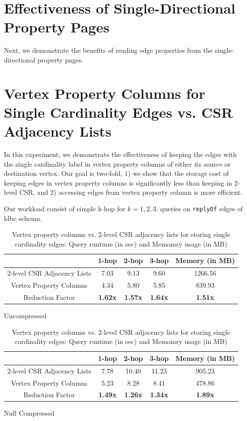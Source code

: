 \section{Effectiveness of Single-Directional Property Pages}
\label{exp:property-pages}

Next, we demonstrate the benefits of reading edge properties from the single-directional property pages.

\section{Vertex Property Columns for Single Cardinality Edges vs. CSR Adjacency Lists}
\label{exp:single-cardinality}

In this experiment, we demonstrate the effectiveness of keeping the edges with the single cardinality label in vertex property columns of either its source or destination vertex. Our goal is two-fold, 1) we show that the storage cost of keeping edges in vertex property columns is significantly less than keeping in 2-level CSR, and 2) accessing edges from vertex property column is more efficient. 

Our workload consist of simple k-hop for $k=1,2,3$. queries on \texttt{replyOf} edges of \gls{ldbc} schema. 

\begin{table}
	\centering
	\begin{subtable}{1\textwidth}
		\centering
		\begin{tabular}{ |c|c|c|c|c| } 
			\hline
			& 1-hop & 2-hop & 3-hop & Memory (in MB) \\ 
			\hline
			2-level CSR Adjacency Lists& 7.03 & 9.13 & 9.60 & 1266.56 \\ 
			\hline
			Vertex Property Columns& 4.34 & 5.80 & 5.85 & 839.93 \\ 
			\hline \hline
			Reduction Factor& \textbf{1.62x} & \textbf{1.57x} & \textbf{1.64x} & \textbf{1.51x} \\ 
			\hline
		\end{tabular}
		\captionsetup{justification=centering}
		\caption{Uncompressed}
		\label{tbl:mem2}
	\end{subtable}
	\begin{subtable}{1\textwidth}
		\centering
		\begin{tabular}{ |c|c|c|c|c| } 
			\hline
			& 1-hop & 2-hop & 3-hop & Memory (in MB) \\ 
			\hline
			2-level CSR Adjacency Lists& 7.78 & 10.40 & 11.23 & 905.23 \\ 
			\hline
			Vertex Property Columns& 5.23 & 8.28 & 8.41 & 478.86 \\ 
			\hline \hline
			Reduction Factor& \textbf{1.49x} & \textbf{1.26x} & \textbf{1.34x} & \textbf{1.89x} \\ 
			\hline
		\end{tabular}
		\captionsetup{justification=centering}
		\caption{Null Compressed}
		\label{tbl:mem2}
	\end{subtable}
	\captionsetup{justification=centering}
	\caption{Vertex property columns vs. 2-level CSR adjacency lists for storing single cardinality edges: Query runtime (in sec) and Memomry usage (in MB)  }
\end{table}

